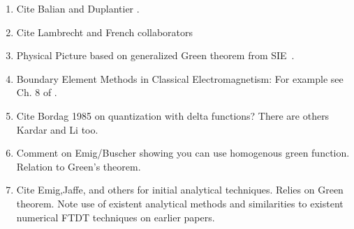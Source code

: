 \begin{enumerate}
\item Cite Balian and Duplantier \cite{Balian1977, Balian1978}.
\item Cite Lambrecht and French collaborators
  \cite{Lambrecht2006, MaiaNeto2008,Canaguier-Durand2012}
\item Physical Picture based on generalized Green theorem from 
  SIE~\cite{Stratton1941}.
  \item Boundary Element Methods in Classical Electromagnetism:
    For example see Ch. 8 of \cite{Chew1995}.  
\item Cite Bordag 1985 on quantization with delta functions?  There are others
Kardar and Li too.  
\item Comment on Emig/Buscher showing you can use homogenous green function.
  Relation to Green's theorem.
\item Cite Emig,Jaffe,  and others for initial analytical techniques.  Relies on Green theorem.
\cite{Emig2004, Emig2007, Rahi2009}
\cite{Kenneth2006}
  Note use of existent analytical methods and similarities to existent 
  numerical FTDT techniques on earlier papers.  
  \cite{Rodriguez2007,Rodriguez2007a, Rodriguez2009}
\end{enumerate}

